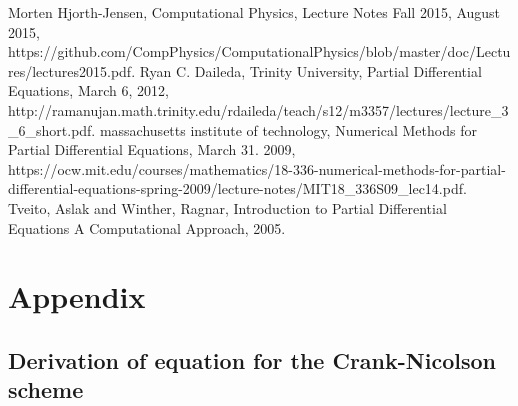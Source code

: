 \documentclass[reprint, english,notitlepage,nofootinbib]{revtex4-1}  %
\begin{document}
\onecolumngrid
\vspace{1cm} %

\begin{thebibliography}{}
 Morten Hjorth-Jensen, Computational Physics, Lecture Notes Fall 2015, August 2015, https://github.com/CompPhysics/ComputationalPhysics/blob/master/doc/Lectures/lectures2015.pdf.
 Ryan C. Daileda, Trinity University, Partial Differential Equations, March 6, 2012, http://ramanujan.math.trinity.edu/rdaileda/teach/s12/m3357/lectures/lecture\_3\_6\_short.pdf.
 massachusetts institute of technology, Numerical Methods for Partial Differential Equations, March 31. 2009, https://ocw.mit.edu/courses/mathematics/18-336-numerical-methods-for-partial-differential-equations-spring-2009/lecture-notes/MIT18\_336S09\_lec14.pdf.
 Tveito, Aslak and Winther, Ragnar, Introduction to Partial Differential Equations A Computational Approach, 2005.

\end{thebibliography}


\section{Appendix}

\subsection{Derivation of equation for the Crank-Nicolson scheme} \label{sect:Crank-Nicolson_derivation}
\end{document}
